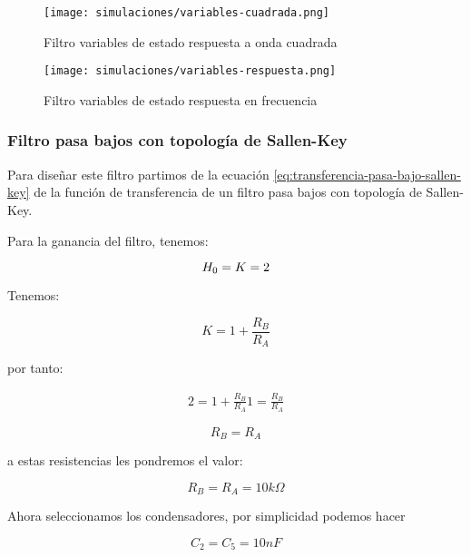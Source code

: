 \begin{figure}[ht]
    \centering
    \texttt{[image: simulaciones/variables-cuadrada.png]}
    \caption{Filtro variables de estado respuesta a onda cuadrada  }
    \label{fig:sim-variables-cuadrada} 
\end{figure}

\begin{figure}[ht]
    \centering
    \texttt{[image: simulaciones/variables-respuesta.png]}
    \caption{Filtro variables de estado respuesta en frecuencia  }
\end{figure}

\FloatBarrier
\subsubsection{Filtro pasa bajos con topología de Sallen-Key}

Para diseñar este filtro partimos de la ecuación \ref{eq:transferencia-pasa-bajo-sallen-key} de la función de transferencia de un filtro pasa bajos con topología de Sallen-Key.

Para la ganancia del filtro, tenemos:

\begin{equation*}
    H_0 = K = 2
\end{equation*}

Tenemos:

\begin{equation}
    K = 1 + \frac{R_B}{R_A}
\end{equation}

por tanto:

\begin{align*}
    2 = 1 + \frac{R_B}{R_A}
    1 = \frac{R_B}{R_A}
\end{align*}

\begin{equation*}
    \boxed{R_B = R_A}
\end{equation*}

a estas resistencias les pondremos el valor:

\begin{equation*}
    \boxed{R_B = R_A = 10k\Omega}
\end{equation*}

Ahora seleccionamos los condensadores, por simplicidad podemos hacer

\begin{equation*}
    \boxed{C_2 = C_5 = 10nF}
\end{equation*}

